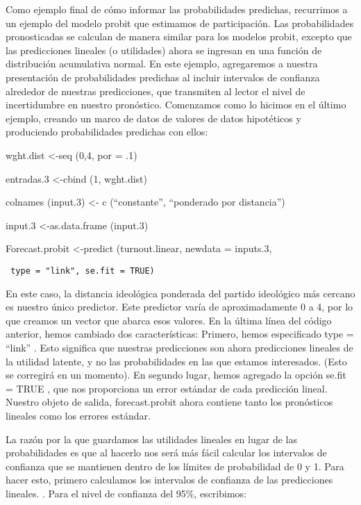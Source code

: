 \documentclass[
]{book}
\begin{document}
Como ejemplo final de cómo informar las probabilidades predichas, recurrimos a un ejemplo del modelo probit que estimamos de participación. Las probabilidades pronosticadas se calculan de manera similar para los modelos probit, excepto que las predicciones lineales (o utilidades) ahora se ingresan en una función de distribución acumulativa normal. En este ejemplo, agregaremos a nuestra presentación de probabilidades predichas al incluir intervalos de confianza alrededor de nuestras predicciones, que transmiten al lector el nivel de incertidumbre en nuestro pronóstico. Comenzamos como lo hicimos en el último ejemplo, creando un marco de datos de valores de datos hipotéticos y produciendo probabilidades predichas con ellos:

wght.dist \textless-seq (0,4, por = .1)

entradas.3 \textless-cbind (1, wght.dist)

colnames (input.3) \textless- c (``constante'', ``ponderado por distancia'')

input.3 \textless-as.data.frame (input.3)

Forecast.probit \textless-predict (turnout.linear, newdata = inputs.3,

\begin{verbatim}
 type = "link", se.fit = TRUE)
\end{verbatim}

En este caso, la distancia ideológica ponderada del partido ideológico más cercano es nuestro único predictor. Este predictor varía de aproximadamente 0 a 4, por lo que creamos un vector que abarca esos valores. En la última línea del código anterior, hemos cambiado dos características: Primero, hemos especificado type = ``link'' . Esto significa que nuestras predicciones son ahora predicciones lineales de la utilidad latente, y no las probabilidades en las que estamos interesados. (Esto se corregirá en un momento). En segundo lugar, hemos agregado la opción se.fit = TRUE , que nos proporciona un error estándar de cada predicción lineal. Nuestro objeto de salida, forecast.probit ahora contiene tanto los pronósticos lineales como los errores estándar.

La razón por la que guardamos las utilidades lineales en lugar de las probabilidades es que al hacerlo nos será más fácil calcular los intervalos de confianza que se mantienen dentro de los límites de probabilidad de 0 y 1. Para hacer esto, primero calculamos los intervalos de confianza de las predicciones lineales. . Para el nivel de confianza del 95\%, escribimos:
\end{document}
